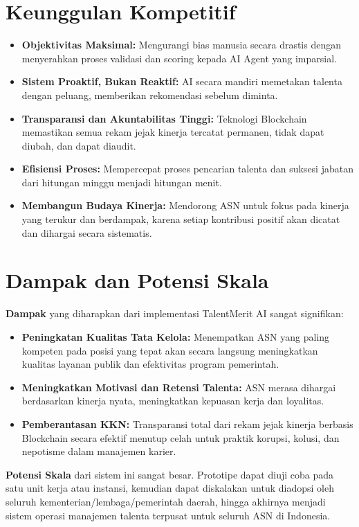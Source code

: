 \documentclass[11pt, a4paper]{article}
\begin{document}
\newpage %
\section{Keunggulan Kompetitif}
\begin{itemize}
    \item \textbf{Objektivitas Maksimal:} Mengurangi bias manusia secara drastis dengan menyerahkan proses validasi dan scoring kepada AI Agent yang imparsial.
    \item \textbf{Sistem Proaktif, Bukan Reaktif:} AI secara mandiri memetakan talenta dengan peluang, memberikan rekomendasi sebelum diminta.
    \item \textbf{Transparansi dan Akuntabilitas Tinggi:} Teknologi Blockchain memastikan semua rekam jejak kinerja tercatat permanen, tidak dapat diubah, dan dapat diaudit.
    \item \textbf{Efisiensi Proses:} Mempercepat proses pencarian talenta dan suksesi jabatan dari hitungan minggu menjadi hitungan menit.
    \item \textbf{Membangun Budaya Kinerja:} Mendorong ASN untuk fokus pada kinerja yang terukur dan berdampak, karena setiap kontribusi positif akan dicatat dan dihargai secara sistematis.
\end{itemize}

\section{Dampak dan Potensi Skala}
\textbf{Dampak} yang diharapkan dari implementasi TalentMerit AI sangat signifikan:
\begin{itemize}
    \item \textbf{Peningkatan Kualitas Tata Kelola:} Menempatkan ASN yang paling kompeten pada posisi yang tepat akan secara langsung meningkatkan kualitas layanan publik dan efektivitas program pemerintah.
    \item \textbf{Meningkatkan Motivasi dan Retensi Talenta:} ASN merasa dihargai berdasarkan kinerja nyata, meningkatkan kepuasan kerja dan loyalitas.
    \item \textbf{Pemberantasan KKN:} Transparansi total dari rekam jejak kinerja berbasis Blockchain secara efektif menutup celah untuk praktik korupsi, kolusi, dan nepotisme dalam manajemen karier.
\end{itemize}
\textbf{Potensi Skala} dari sistem ini sangat besar. Prototipe dapat diuji coba pada satu unit kerja atau instansi, kemudian dapat diskalakan untuk diadopsi oleh seluruh kementerian/lembaga/pemerintah daerah, hingga akhirnya menjadi sistem operasi manajemen talenta terpusat untuk seluruh ASN di Indonesia.
\end{document}
